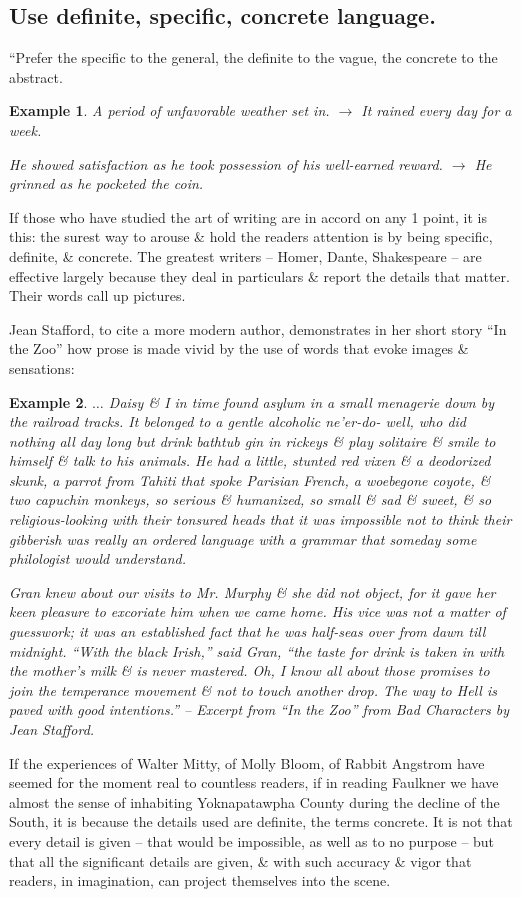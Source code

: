 \documentclass{article}
\numberwithin{equation}{section}
\newtheorem{example}{Example}[section]
\begin{document}
\subsection{Use definite, specific, concrete  language.}
``Prefer the specific to the general, the definite to the vague, the concrete to the abstract.
\begin{example}
	A period of unfavorable weather set in. $\to$ It rained every day for a week.
	
	He showed satisfaction as he took possession of his well-earned reward. $\to$ He grinned as he pocketed the coin.
\end{example}
If those who have studied the art of writing are in accord on any 1 point, it is this: the surest way to arouse \& hold the readers attention is by being specific, definite, \& concrete. The greatest writers -- Homer, Dante, Shakespeare -- are effective largely because they deal in particulars \& report the details that matter. Their words call up pictures.

Jean Stafford, to cite a more modern author, demonstrates in her short story ``In the Zoo'' how prose is made vivid by the use of words that evoke images \& sensations:
\begin{example}
	$\ldots$ Daisy \& I in time found asylum in a small menagerie down by the railroad tracks. It belonged to a gentle alcoholic ne'er-do- well, who did nothing all day long but drink bathtub gin in rickeys \&  play solitaire \&  smile to himself \&  talk to his animals. He had a little, stunted red vixen \&  a deodorized skunk, a parrot from Tahiti that spoke Parisian French, a woebegone coyote, \&  two capuchin monkeys, so serious \&  humanized, so small \&  sad \&  sweet, \&  so religious-looking with their tonsured heads that it was impossible not to think their gibberish was really an ordered language with a grammar that someday some philologist would understand.
	
	Gran knew about our visits to Mr. Murphy \&  she did not object, for it gave her keen pleasure to excoriate him when we came home. His vice was not a matter of guesswork; it was an established fact that he was half-seas over from dawn till midnight. ``With the black Irish,'' said Gran, ``the taste for drink is taken in with the mother's milk \&  is never mastered. Oh, I know all about those promises to join the temperance movement \&  not to touch another drop. The way to Hell is paved with good intentions.'' -- Excerpt from ``In the Zoo'' from Bad Characters by Jean Stafford.
\end{example}
If the experiences of Walter Mitty, of Molly Bloom, of Rabbit Angstrom have seemed for the moment real to countless readers, if in reading Faulkner we have almost the sense of inhabiting Yoknapatawpha County during the decline of the South, it is because the details used are definite, the terms concrete. It is not that every detail is given -- that would be impossible, as well as to no purpose -- but that all the significant details are given, \&  with such accuracy \&  vigor that readers, in imagination, can project themselves into the scene.
\end{document}
